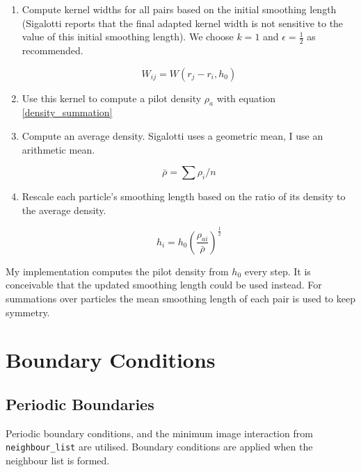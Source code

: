 \begin{enumerate}
\item Compute kernel widths for all pairs based on the initial smoothing length
(Sigalotti reports that the final adapted kernel width is not sensitive to the
value of this initial smoothing length). We choose $k=1$ and
$\epsilon=\frac{1}{2}$ as recommended.

\begin{equation}
W_{ij} = W(r_{j} - r_{i},h_{0})
\end{equation}

\item Use this kernel to compute a pilot density $\rho_{a}$ with equation
\ref{density_summation}

\item Compute an average density. Sigalotti uses a geometric mean, I use an
arithmetic mean. 

\begin{equation}
\bar{\rho} = \sum \rho_{i} / n
\end{equation}

\item Rescale each particle's smoothing length based on the ratio of its
density to the average density.

\begin{equation}
h_{i} = h_{0} \left(\frac{\rho_{ai}}{\bar{\rho}}\right)^{\frac{1}{2}}
\end{equation}

\end{enumerate}

My implementation computes the pilot density from $h_0$ every step. It is
conceivable that the updated smoothing length could be used instead. For
summations over particles the mean smoothing length of each pair is used to
keep symmetry.

\section{Boundary Conditions}

\subsection{Periodic Boundaries}
Periodic boundary conditions, and the minimum image interaction from
\texttt{neighbour\_list} are utilised. Boundary conditions are applied when the
neighbour list is formed.

